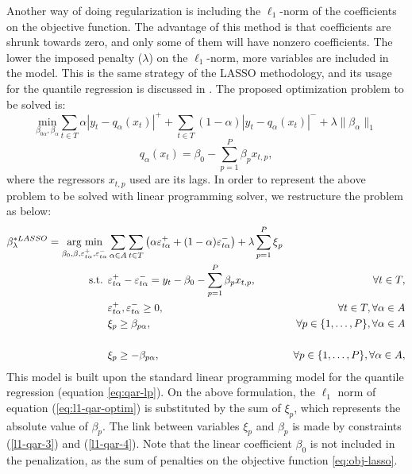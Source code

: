 Another way of doing regularization is including the $\ell_1$-norm of the coefficients on the objective function. The advantage of this method is that coefficients are shrunk towards zero, and only some of them will have nonzero coefficients. The lower the imposed penalty ($\lambda$) on the $\ell_1$-norm, more variables are included in the model. 
This is the same strategy of the LASSO methodology, and its usage for the quantile regression is discussed in \cite{li2012l1}.
The proposed optimization problem to be solved is:
\begin{equation}
\underset{\beta_{0\alpha},\beta_\alpha}{\text{min}} \sum_{t \in T}\alpha|y_{t}-q_\alpha(x_t)|^{+}+ \sum_{t \in T}(1-\alpha)|y_{t}-q_\alpha(x_t)|^{-}+\lambda\|\beta_\alpha\|_{1}
\label{eq:l1-qar-optim}
\end{equation}
\[
q_\alpha(x_t)=\beta_{0}-\sum_{p=1}^{P}\beta_{p}x_{t,p},
\]
where the regressors $x_{t,p}$ used are its lags. In order to represent the above problem to be solved with linear programming solver, we restructure the problem as below:
\begin{eqnarray}
\beta_\lambda^{*LASSO} = \underset{\beta_{0},\beta,\varepsilon_{t \alpha}^{+},\varepsilon_{t \alpha}^{-}}{\text{arg min}} & \sum_{\alpha \in A} \sum_{t \in T}\left(\alpha\varepsilon_{t \alpha}^{+}+(1-\alpha)\varepsilon_{t \alpha}^{-}\right)+\lambda\sum_{p=1}^{P}\mbox{\ensuremath{\xi}}_{p} \label{eq:obj-lasso} \\
\mbox{s.t. } & \varepsilon_{t \alpha}^{+}-\varepsilon_{t \alpha}^{-}=y_{t}-\beta_{0}-\sum_{p=1}^{P}\beta_{p}x_{t,p},&\forall t\in T,\\
& \varepsilon_{t \alpha}^{+},\varepsilon_{t \alpha}^{-}\geq0,&\forall t \in T, \forall \alpha \in A\\
& \xi_{p}\geq\beta_{p \alpha},&\forall p\in\{1,\dots,P\}, \forall \alpha \in A  \nonumber\\ \label{l1-qar-3}
\\
& \xi_{p}\geq-\beta_{p \alpha},&\forall p\in\{1,\dots,P\}, \forall \alpha \in A,  \nonumber \\ \label{l1-qar-4}
\end{eqnarray}
This model is built upon the standard linear programming model for the quantile regression (equation \ref{eq:qar-lp}). 
On the above formulation, the $\ell_1$ norm of equation (\ref{eq:l1-qar-optim}) is substituted by the sum of $\xi_p$, which represents the absolute value of $\beta_p$. The link between variables $\xi_p$ and $\beta_p$ is made by constraints (\ref{l1-qar-3}) and (\ref{l1-qar-4}). Note that the linear coefficient $\beta_0$ is not included in the penalization, as the sum of penalties on the objective function \ref{eq:obj-lasso}.

